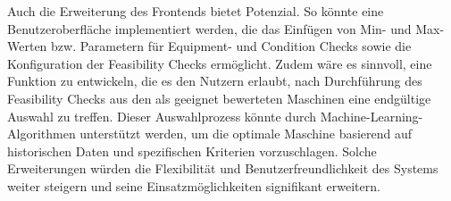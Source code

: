Auch die Erweiterung des Frontends bietet Potenzial. So könnte eine Benutzeroberfläche implementiert werden, die das Einfügen von Min- und Max-Werten bzw. Parametern für Equipment- und Condition Checks sowie die Konfiguration der Feasibility Checks ermöglicht. Zudem wäre es sinnvoll, eine Funktion zu entwickeln, die es den Nutzern erlaubt, nach Durchführung des Feasibility Checks aus den als geeignet bewerteten Maschinen eine endgültige Auswahl zu treffen. Dieser Auswahlprozess könnte durch Machine-Learning-Algorithmen unterstützt werden, um die optimale Maschine basierend auf historischen Daten und spezifischen Kriterien vorzuschlagen. Solche Erweiterungen würden die Flexibilität und Benutzerfreundlichkeit des Systems weiter steigern und seine Einsatzmöglichkeiten signifikant erweitern.
